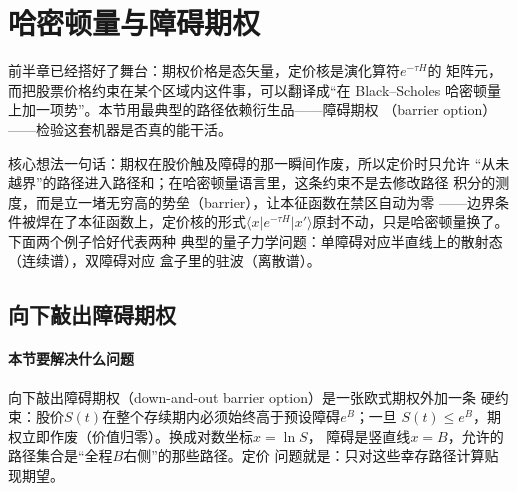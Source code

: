 
\section{哈密顿量与障碍期权}

前半章已经搭好了舞台：期权价格是态矢量，定价核是演化算符$e^{-\tau H}$的
矩阵元，而把股票价格约束在某个区域内这件事，可以翻译成“在 Black--Scholes
哈密顿量上加一项势”。本节用最典型的路径依赖衍生品——障碍期权
（barrier option）——检验这套机器是否真的能干活。

核心想法一句话：期权在股价触及障碍的那一瞬间作废，所以定价时只允许
“从未越界”的路径进入路径和；在哈密顿量语言里，这条约束不是去修改路径
积分的测度，而是立一堵无穷高的势垒（barrier），让本征函数在禁区自动为零
——边界条件被焊在了本征函数上，定价核的形式$\langle x\vert e^{-\tau H}
\vert x'\rangle$原封不动，只是哈密顿量换了。下面两个例子恰好代表两种
典型的量子力学问题：单障碍对应半直线上的散射态（连续谱），双障碍对应
盒子里的驻波（离散谱）。

\subsection{向下敲出障碍期权}

\paragraph{本节要解决什么问题}
向下敲出障碍期权（down-and-out barrier option）是一张欧式期权外加一条
硬约束：股价$S(t)$在整个存续期内必须始终高于预设障碍$e^{B}$；一旦
$S(t)\leq e^{B}$，期权立即作废（价值归零）。换成对数坐标$x=\ln S$，
障碍是竖直线$x=B$，允许的路径集合是“全程$B$右侧”的那些路径。定价
问题就是：只对这些幸存路径计算贴现期望。

